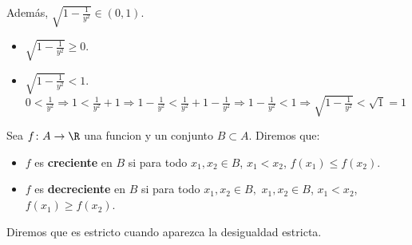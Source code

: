 \begin{example}
\begin{itemize}
		      Además, \(\sqrt{1 - \frac{1}{y^{2} }} \in (0,1 )\).
		      \begin{itemize}
			      \item \(\sqrt{1 - \frac{1}{y^{2} }} \geq 0 \).
			      \item \(\sqrt{1 - \frac{1}{y^{2} }} < 1 \). \(0 < \frac{1}{y^{2} } \Rightarrow 1 < \frac{1}{y^{2} } + 1 \Rightarrow 1 - \frac{1}{y^{2} } < \frac{1}{y^{2} } + 1 - \frac{1}{y^{2} } \Rightarrow 1 - \frac{1}{y^{2} } < 1 \Rightarrow \sqrt{1 - \frac{1}{y^{2} }} < \sqrt{1} = 1   \)
		      \end{itemize}
	\end{itemize}
\end{example}
\begin{proposition}
	Sea \(f \colon A \to \R \) una funcion y un conjunto \(B \subset A \). Diremos que:
	\begin{itemize}
		\item \(f \) es \textbf{creciente}  en \(B \) si para todo \(x_1,x_2 \in B \), \(x_1 < x_2 \), \(f(x_1) \leq f(x_2 )\).
		\item \(f \) es \textbf{decreciente}  en \(B \) si para todo \(x_1,x_2 \in B ,\) \(x_1,x_2 \in B \), \(x_1 < x_2 \), \(f(x_1) \geq f(x_2 )\).
	\end{itemize}
	Diremos que es estricto cuando aparezca la desigualdad estricta.
\end{proposition}

